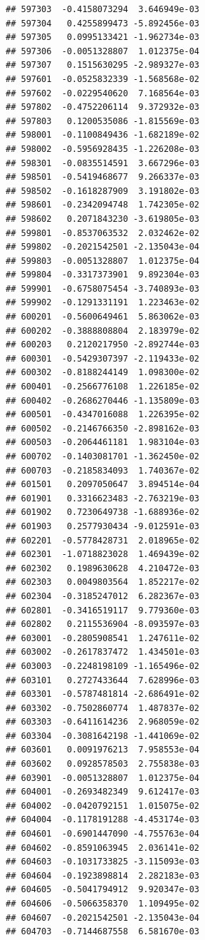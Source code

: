 \documentclass[ignorenonframetext,]{beamer}
\begin{document}
\begin{frame}[fragile]
\begin{verbatim}
## 597303  -0.4158073294  3.646949e-03
## 597304   0.4255899473 -5.892456e-03
## 597305   0.0995133421 -1.962734e-03
## 597306  -0.0051328807  1.012375e-04
## 597307   0.1515630295 -2.989327e-03
## 597601  -0.0525832339 -1.568568e-02
## 597602  -0.0229540620  7.168564e-03
## 597802  -0.4752206114  9.372932e-03
## 597803   0.1200535086 -1.815569e-03
## 598001  -0.1100849436 -1.682189e-02
## 598002  -0.5956928435 -1.226208e-03
## 598301  -0.0835514591  3.667296e-03
## 598501  -0.5419468677  9.266337e-03
## 598502  -0.1618287909  3.191802e-03
## 598601  -0.2342094748  1.742305e-02
## 598602   0.2071843230 -3.619805e-03
## 599801  -0.8537063532  2.032462e-02
## 599802  -0.2021542501 -2.135043e-04
## 599803  -0.0051328807  1.012375e-04
## 599804  -0.3317373901  9.892304e-03
## 599901  -0.6758075454 -3.740893e-03
## 599902  -0.1291331191  1.223463e-02
## 600201  -0.5600649461  5.863062e-03
## 600202  -0.3888808804  2.183979e-02
## 600203   0.2120217950 -2.892744e-03
## 600301  -0.5429307397 -2.119433e-02
## 600302  -0.8188244149  1.098300e-02
## 600401  -0.2566776108  1.226185e-02
## 600402  -0.2686270446 -1.135809e-03
## 600501  -0.4347016088  1.226395e-02
## 600502  -0.2146766350 -2.898162e-03
## 600503  -0.2064461181  1.983104e-03
## 600702  -0.1403081701 -1.362450e-02
## 600703  -0.2185834093  1.740367e-02
## 601501   0.2097050647  3.894514e-04
## 601901   0.3316623483 -2.763219e-03
## 601902   0.7230649738 -1.688936e-02
## 601903   0.2577930434 -9.012591e-03
## 602201  -0.5778428731  2.018965e-02
## 602301  -1.0718823028  1.469439e-02
## 602302   0.1989630628  4.210472e-03
## 602303   0.0049803564  1.852217e-02
## 602304  -0.3185247012  6.282367e-03
## 602801  -0.3416519117  9.779360e-03
## 602802   0.2115536904 -8.093597e-03
## 603001  -0.2805908541  1.247611e-02
## 603002  -0.2617837472  1.434501e-03
## 603003  -0.2248198109 -1.165496e-02
## 603101   0.2727433644  7.628996e-03
## 603301  -0.5787481814 -2.686491e-02
## 603302  -0.7502860774  1.487837e-02
## 603303  -0.6411614236  2.968059e-02
## 603304  -0.3081642198 -1.441069e-02
## 603601   0.0091976213  7.958553e-04
## 603602   0.0928578503  2.755838e-03
## 603901  -0.0051328807  1.012375e-04
## 604001  -0.2693482349  9.612417e-03
## 604002  -0.0420792151  1.015075e-02
## 604004  -0.1178191288 -4.453174e-03
## 604601  -0.6901447090 -4.755763e-04
## 604602  -0.8591063945  2.036141e-02
## 604603  -0.1031733825 -3.115093e-03
## 604604  -0.1923898814  2.282183e-03
## 604605  -0.5041794912  9.920347e-03
## 604606  -0.5066358370  1.109495e-02
## 604607  -0.2021542501 -2.135043e-04
## 604703  -0.7144687558  6.581670e-03

\end{verbatim}
\end{frame}
\end{document}
